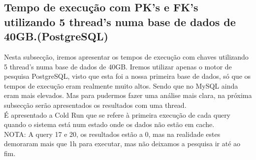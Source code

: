 \documentclass{article}
\begin{document}
  \subsection{Tempo de execução com PK's e FK's utilizando 5 thread's numa base de dados de 40GB.(PostgreSQL)}
\quad Nesta subsecção, iremos apresentar os tempos de execução com chaves utilizando 5 thread's numa base de dados de 40GB. Iremos utilizar apenas o motor de pesquisa PostgreSQL, visto que esta foi a nossa primeira base de dados, só que os tempos de execução eram realmente muito altos. Sendo que no MySQL ainda eram mais elevados. Mas para pudermos fazer uma análise mais clara, na próxima subsecção serão apresentados os resultados com uma thread.\\
\quad É apresentado a Cold Run que se refere à primeira execução de cada query quando o sistema está num estado onde os dados não estão em cache.\\
NOTA: A query 17 e 20, os resultados estão a 0, mas na realidade estes demoraram mais que 1h para executar, mas não deixamos a pesquisa ir até ao fim.
\end{document}

